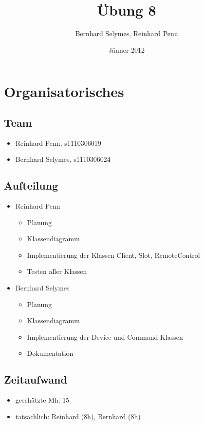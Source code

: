 \documentclass[12pt,a4paper]{article}
\begin{document}
\title{Übung 8}
\author{Bernhard Selymes, Reinhard Penn}
\date{Jänner 2012}

\normalsize

\newcommand{\CodePath}{../RemoteControl/RemoteControl/}

\section{Organisatorisches}

\subsection{Team}
	\begin {itemize} 
		\item Reinhard Penn, s1110306019 
		\item Bernhard Selymes, s1110306024
	\end {itemize}

\subsection{Aufteilung}
	\begin {itemize} 
		\item Reinhard Penn
			\begin {itemize}
				\item Planung
				\item Klassendiagramm
				\item Implementierung der Klassen Client, Slot, RemoteControl
				\item Testen aller Klassen
			\end {itemize}
		\item Bernhard Selymes
			\begin {itemize}
				\item Planung
				\item Klassendiagramm
				\item Implementierung der Device und Command Klassen
				\item Dokumentation		
			\end {itemize}
	\end {itemize}


\subsection{Zeitaufwand}
	\begin {itemize}
		\item geschätzte Mh: 15
		\item tatsächlich: Reinhard (8h), Bernhard  (8h)
	\end {itemize}
\end{document}
